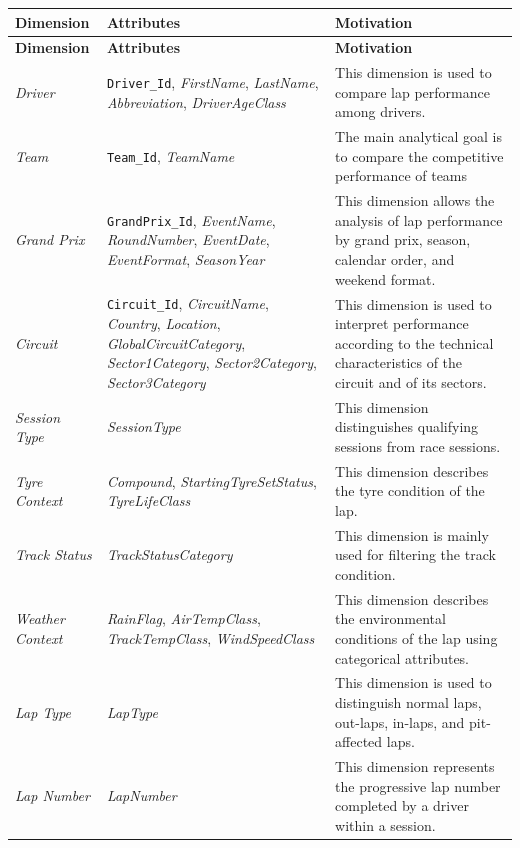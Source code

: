 \documentclass[a4paper,11pt]{article}
\begin{document}
	\begin{longtable}{|p{3cm}|p{6cm}|p{8cm}|}
		\hline
		\textbf{Dimension} & \textbf{Attributes} & \textbf{Motivation} \\
		\hline
		\endfirsthead
		
		\hline
		\textbf{Dimension} & \textbf{Attributes} & \textbf{Motivation} \\
		\hline
		\endhead
		
		\textit{Driver}
		& \texttt{Driver\_Id}, \textit{FirstName}, \textit{LastName}, \textit{Abbreviation}, \textit{DriverAgeClass}
		& This dimension is used to compare lap performance among drivers. \\
		\hline
		
		\textit{Team}
		& \texttt{Team\_Id}, \textit{TeamName}
		&  The main analytical goal is to compare
		the competitive performance of teams \\
		\hline
		
		\textit{Grand Prix}
		& \texttt{GrandPrix\_Id}, \textit{EventName}, \textit{RoundNumber}, \textit{EventDate},
		\textit{EventFormat}, \textit{SeasonYear}
		& This dimension allows the analysis of lap performance by grand prix, season, calendar
		order, and weekend format. \\
		\hline
		
		\textit{Circuit}
		& \texttt{Circuit\_Id}, \textit{CircuitName}, \textit{Country}, \textit{Location},
		\textit{GlobalCircuitCategory}, \textit{Sector1Category}, \textit{Sector2Category},
		\textit{Sector3Category}
		& This dimension is used to interpret performance according to the technical
		characteristics of the circuit and of its sectors.  \\
		\hline
		
		\textit{Session Type}
		& \textit{SessionType}
		& This dimension distinguishes qualifying sessions from race sessions. \\
		\hline
		
		\textit{Tyre Context}
		& \textit{Compound}, \textit{StartingTyreSetStatus}, \textit{TyreLifeClass}
		& This dimension describes the tyre condition of the lap. \\
		\hline
		
		\textit{Track Status}
		&  \textit{TrackStatusCategory}
		& This dimension is mainly used for filtering the track condition. \\
		\hline
		
		\textit{Weather Context}
		& \textit{RainFlag}, \textit{AirTempClass}, \textit{TrackTempClass}, \textit{WindSpeedClass}
		& This dimension describes the environmental conditions of the lap using categorical
		attributes. \\
		\hline
		
		
		\textit{Lap Type}
		& \textit{LapType}
		& This dimension is used to distinguish normal laps, out-laps, in-laps, and pit-affected laps. \\
		\hline
		
		\textit{Lap Number}
		& \textit{LapNumber}
		& This dimension represents the progressive lap number completed by a driver within a session.  \\
		\hline
		
	\end{longtable}
	
\end{document}
